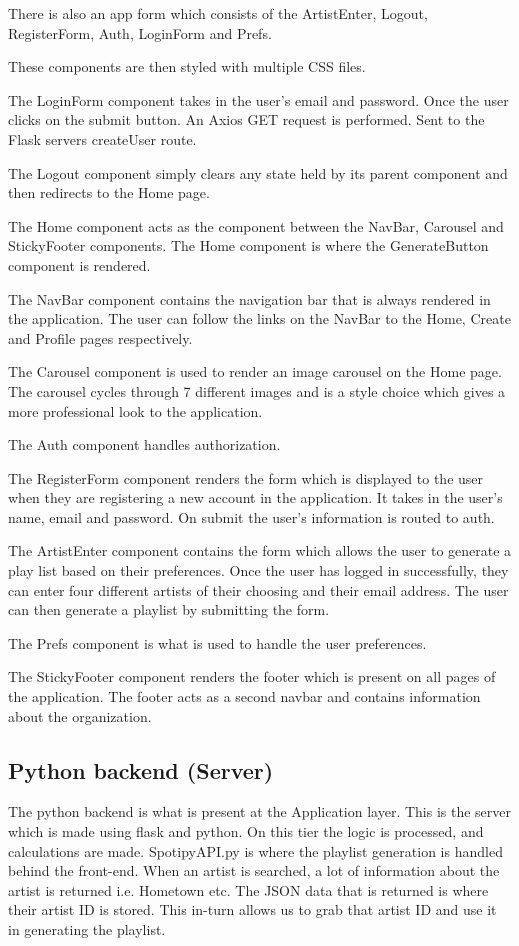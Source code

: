 There is also an app form which consists of the ArtistEnter, Logout, RegisterForm, Auth, LoginForm and Prefs.

These components are then styled with multiple CSS files.


The LoginForm component takes in the user’s email and password. Once the user clicks on the submit button. An Axios GET request is performed. Sent to the Flask servers createUser route.

The Logout component simply clears any state held by its parent component and then redirects to the Home page.

The Home component acts as the component between the NavBar, Carousel and StickyFooter components. The Home component is where the GenerateButton component is rendered.

The NavBar component contains the navigation bar that is always rendered in the application. The user can follow the links on the NavBar to the Home, Create and Profile pages respectively.

The Carousel component is used to render an image carousel on the Home page. The carousel cycles through 7 different images and is a style choice which gives a more professional look to the application.

The Auth component handles authorization.

The RegisterForm component renders the form which is displayed to the user when they are registering a new account in the application. It takes in the user’s name, email and password. On submit the user’s information is routed to auth.

The ArtistEnter component contains the form which allows the user to generate a play list based on their preferences. Once the user has logged in successfully, they can enter four different artists of their choosing and their email address. The user can then generate a playlist by submitting the form.

The Prefs component is what is used to handle the user preferences.

The StickyFooter component renders the footer which is present on all pages of the application. The footer acts as a second navbar and contains information about the organization.

\subsection{Python backend (Server)}
The python backend is what is present at the Application layer. This is the server which is made using flask and python. On this tier the logic is processed, and calculations are made.
SpotipyAPI.py is where the playlist generation is handled behind the front-end. When an artist is searched, a lot of information about the artist is returned i.e. Hometown etc.
The JSON data that is returned is where their artist ID is stored. This in-turn allows us to grab that artist ID and use it in generating the playlist. 

